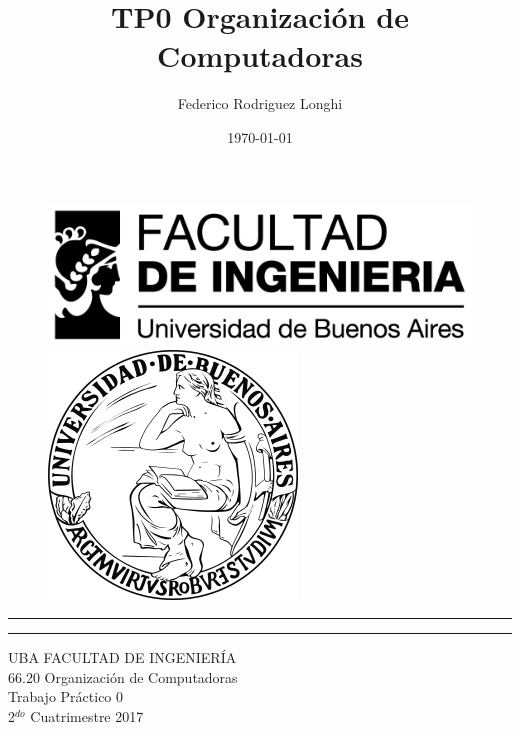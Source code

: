 \documentclass[11pt,a4paper]{article}
\begin{document}
\title{TP0 Organización de Computadoras}
\author{Federico Rodriguez Longhi}		
\date{\today}

\begin{titlepage}
	
	\begin{figure}[H]
		\raggedright
		\includegraphics[scale=0.25]{logo_fiuba2}
		\hfill
		\raggedleft
		\includegraphics[scale=0.2]{logo_uba}
	\end{figure}
	\rule{\textwidth}{1pt}\par %
	\vspace{2pt}\vspace{-\baselineskip} %
	\rule{\textwidth}{0.4pt}\par %
	
	\vspace{0.05\textheight} %
	\centering %
	{\Huge UBA FACULTAD DE INGENIERÍA}\\[0.5\baselineskip]
	{\Large 66.20 Organización de Computadoras}\\[0.5\baselineskip]
	{\Huge Trabajo Práctico 0}\\[0.75\baselineskip]
	{\Large 2$^{do}$ Cuatrimestre 2017}\\[0.5\baselineskip]
	\vspace{0.05\textheight}



\end{titlepage}
\end{document}
